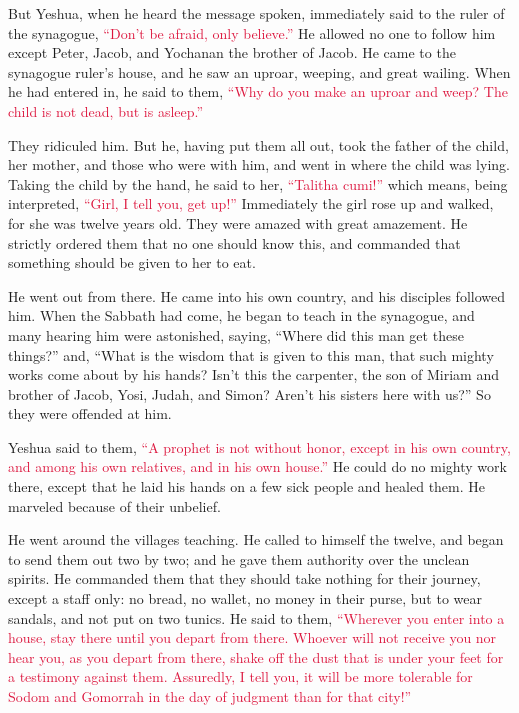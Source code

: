 \myverse{}But Yeshua, when he heard the message spoken, immediately said
to the ruler of the synagogue,
\textcolor{crimson}{“Don’t be afraid, only believe.”}
\myverse{}He allowed no one to follow him except Peter, Jacob, and Yochanan the brother
of Jacob.
\myverse{}He came to the synagogue ruler’s house, and he saw an uproar, weeping, and
great wailing.
\myverse{}When he had entered in, he said to them,
\textcolor{crimson}{“Why do you make an uproar and weep? The child is not dead, but is asleep.”}

\myverse{}They ridiculed him. But he, having put them all out, took the
father of the child, her mother, and those who were with him, and went in where the child was lying.
\myverse{}Taking the child by the hand, he said to her,
\textcolor{crimson}{“Talitha cumi!”
} which means, being interpreted,
\textcolor{crimson}{“Girl, I tell you, get up!”
}
\myverse{}Immediately the girl rose up and walked, for she was twelve years old. They
were amazed with great amazement.
\myverse{}He strictly ordered them that no one should know this, and commanded that
something should be given to her to eat.


\mychapter{} \myverse*{}He went out from there. He came into his own country, and his disciples
followed him.
\myverse{}When the Sabbath had come, he began to teach in the synagogue, and many hearing
him were astonished, saying, “Where did this man get these things?” and, “What is the wisdom that is given
to this man, that such mighty works come about by his hands?
\myverse{}Isn’t this the carpenter, the son of Miriam and brother of Jacob, Yosi, Judah,
and Simon? Aren’t his sisters here with us?” So they were offended at him.

\myverse{}Yeshua said to them,
\textcolor{crimson}{“A prophet is not without honor, except in his own country, and among his own relatives, and in his
	own house.”}
\myverse{}He could do no mighty work there, except that he laid his hands on a few sick
people and healed them.
\myverse{}He marveled because of their unbelief.

He went around the villages teaching.
\myverse{}He called to himself the twelve, and began to send them out two by two; and
he gave them authority over the unclean spirits.
\myverse{}He commanded them that they should take nothing for their journey, except a
staff only: no bread, no wallet, no money in their purse,
\myverse{}but to wear sandals, and not put on two tunics.
\myverse{}He said to them,
\textcolor{crimson}{“Wherever you enter into a house, stay there until you depart from there.
}
\myverse{}\textcolor{crimson}{Whoever will not receive you nor hear you, as you depart from there, shake
	off the dust that is under your feet for a testimony against them. Assuredly, I tell you, it will be more
	tolerable for Sodom and Gomorrah in the day of judgment than for that city!”}


